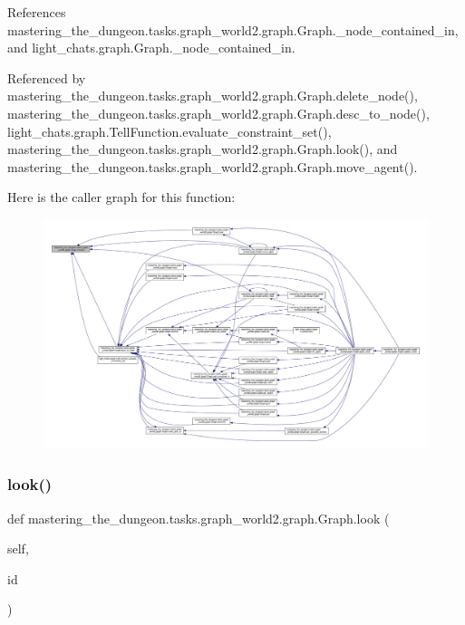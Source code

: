 References mastering\+\_\+the\+\_\+dungeon.\+tasks.\+graph\+\_\+world2.\+graph.\+Graph.\+\_\+node\+\_\+contained\+\_\+in, and light\+\_\+chats.\+graph.\+Graph.\+\_\+node\+\_\+contained\+\_\+in.



Referenced by mastering\+\_\+the\+\_\+dungeon.\+tasks.\+graph\+\_\+world2.\+graph.\+Graph.\+delete\+\_\+node(), mastering\+\_\+the\+\_\+dungeon.\+tasks.\+graph\+\_\+world2.\+graph.\+Graph.\+desc\+\_\+to\+\_\+node(), light\+\_\+chats.\+graph.\+Tell\+Function.\+evaluate\+\_\+constraint\+\_\+set(), mastering\+\_\+the\+\_\+dungeon.\+tasks.\+graph\+\_\+world2.\+graph.\+Graph.\+look(), and mastering\+\_\+the\+\_\+dungeon.\+tasks.\+graph\+\_\+world2.\+graph.\+Graph.\+move\+\_\+agent().

Here is the caller graph for this function\+:
\nopagebreak
\begin{figure}[H]
\begin{center}
\leavevmode
\includegraphics[width=350pt]{classmastering__the__dungeon_1_1tasks_1_1graph__world2_1_1graph_1_1Graph_a12a9049b513829474158738f5a3d57d8_icgraph}
\end{center}
\end{figure}
\mbox{\label{classmastering__the__dungeon_1_1tasks_1_1graph__world2_1_1graph_1_1Graph_ad1d29bcd12397fa3b8813799f9b4f058}} 
\subsubsection{\texorpdfstring{look()}{look()}}
{\footnotesize\ttfamily def mastering\+\_\+the\+\_\+dungeon.\+tasks.\+graph\+\_\+world2.\+graph.\+Graph.\+look (\begin{DoxyParamCaption}\item[{}]{self,  }\item[{}]{id }\end{DoxyParamCaption})}



